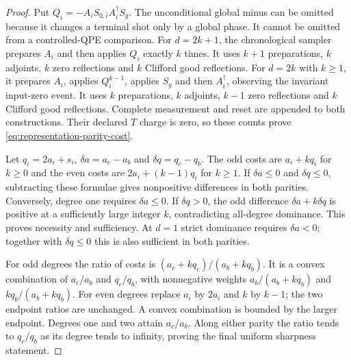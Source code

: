 \begin{proof}
Put $Q_i=-A_iS_{0,i}A_i^\dagger S_g$. The unconditional global minus
can be omitted because it changes a terminal shot only by a global
phase. It cannot be omitted from a controlled-QPE comparison. For
$d=2k+1$, the chronological sampler prepares $A_i$ and then applies
$Q_i$ exactly $k$ times. It uses $k+1$ preparations, $k$ adjoints,
$k$ zero reflections and $k$ Clifford good reflections. For $d=2k$
with $k\geq1$, it prepares $A_i$, applies $Q_i^{k-1}$, applies $S_g$
and then $A_i^\dagger$, observing the invariant input-zero event. It
uses $k$ preparations, $k$ adjoints, $k-1$ zero reflections and $k$
Clifford good reflections. Complete measurement and reset are appended
to both constructions. Their declared $T$ charge is zero, so these
counts prove \eqref{eq:representation-parity-cost}.

Let $q_i=2a_i+s_i$, $\delta a=a_c-a_b$ and $\delta q=q_c-q_b$.
The odd costs are $a_i+kq_i$ for $k\geq0$ and the even costs are
$2a_i+(k-1)q_i$ for $k\geq1$. If $\delta a\leq0$ and
$\delta q\leq0$, subtracting these formulae gives nonpositive
differences in both parities. Conversely, degree one requires
$\delta a\leq0$. If $\delta q>0$, the odd difference
$\delta a+k\delta q$ is positive at a sufficiently large integer
$k$, contradicting all-degree dominance. This proves necessity and
sufficiency. At $d=1$ strict dominance requires $\delta a<0$; together
with $\delta q\leq0$ this is also sufficient in both parities.

For odd degrees the ratio of costs is
$(a_c+kq_c)/(a_b+kq_b)$. It is a convex combination of $a_c/a_b$
and $q_c/q_b$, with nonnegative weights
$a_b/(a_b+kq_b)$ and $kq_b/(a_b+kq_b)$. For even degrees replace
$a_i$ by $2a_i$ and $k$ by $k-1$; the two endpoint ratios are
unchanged. A convex combination is bounded by the larger endpoint.
Degrees one and two attain $a_c/a_b$. Along either parity the ratio
tends to $q_c/q_b$ as its degree tends to infinity, proving the final
uniform sharpness statement.
\end{proof}

